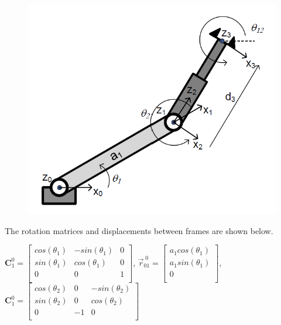 \documentclass[12pt,letterpaper, onecolumn]{exam}
\begin{document}
\begin{questions}
{        \begin{figure}[!h]
            \centering
            \includegraphics[width=0.5\linewidth]{Q2ps.png}
        \end{figure}

        The rotation matrices and displacements between frames are shown below.

        \centering
        $\mathbf{C}_1^0 =
            \begin{bmatrix}
                cos(\theta_1) & -sin(\theta_1) & 0 \\
                sin(\theta_1) & cos(\theta_1)  & 0 \\
                0             & 0              & 1 \\
            \end{bmatrix}
        $,
        $\vec{r}^{\;0}_{01} =
            \begin{bmatrix}
                a_1cos(\theta_1) \\
                a_1sin(\theta_1) \\
                0                \\
            \end{bmatrix}
        $,
        $\mathbf{C}_1^0 =
            \begin{bmatrix}
                cos(\theta_2) & 0  & -sin(\theta_2) \\
                sin(\theta_2) & 0  & cos(\theta_2)  \\
                0             & -1 & 0              \\
            \end{bmatrix}
        $

}
\end{questions}
\end{document}
